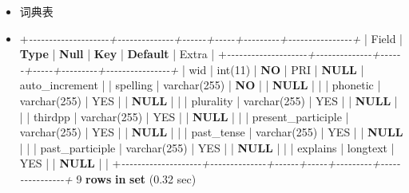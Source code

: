 \documentclass[
]{article}
\newenvironment{Shaded}{}{}
\newcommand{\CommentTok}[1]{\textcolor[rgb]{0.38,0.63,0.69}{\textit{#1}}}
\newcommand{\DataTypeTok}[1]{\textcolor[rgb]{0.56,0.13,0.00}{#1}}
\newcommand{\DecValTok}[1]{\textcolor[rgb]{0.25,0.63,0.44}{#1}}
\newcommand{\FloatTok}[1]{\textcolor[rgb]{0.25,0.63,0.44}{#1}}
\newcommand{\KeywordTok}[1]{\textcolor[rgb]{0.00,0.44,0.13}{\textbf{#1}}}
\newcommand{\NormalTok}[1]{#1}
\newcommand{\OperatorTok}[1]{\textcolor[rgb]{0.40,0.40,0.40}{#1}}
\begin{document}
\begin{itemize}
\item
  词典表
\item
\begin{Shaded}
\begin{Highlighting}[]
\OperatorTok{+}\CommentTok{{-}{-}{-}{-}{-}{-}{-}{-}{-}{-}{-}{-}{-}{-}{-}{-}{-}{-}{-}{-}+{-}{-}{-}{-}{-}{-}{-}{-}{-}{-}{-}{-}{-}{-}+{-}{-}{-}{-}{-}{-}+{-}{-}{-}{-}{-}+{-}{-}{-}{-}{-}{-}{-}{-}{-}+{-}{-}{-}{-}{-}{-}{-}{-}{-}{-}{-}{-}{-}{-}{-}{-}+}
\NormalTok{| Field              | }\KeywordTok{Type}\NormalTok{         | }\KeywordTok{Null}\NormalTok{ | }\KeywordTok{Key}\NormalTok{ | }\KeywordTok{Default}\NormalTok{ | Extra          |}
\OperatorTok{+}\CommentTok{{-}{-}{-}{-}{-}{-}{-}{-}{-}{-}{-}{-}{-}{-}{-}{-}{-}{-}{-}{-}+{-}{-}{-}{-}{-}{-}{-}{-}{-}{-}{-}{-}{-}{-}+{-}{-}{-}{-}{-}{-}+{-}{-}{-}{-}{-}+{-}{-}{-}{-}{-}{-}{-}{-}{-}+{-}{-}{-}{-}{-}{-}{-}{-}{-}{-}{-}{-}{-}{-}{-}{-}+}
\NormalTok{| wid                | }\DataTypeTok{int}\NormalTok{(}\DecValTok{11}\NormalTok{)      | }\KeywordTok{NO}\NormalTok{   | PRI | }\KeywordTok{NULL}\NormalTok{    | auto\_increment |}
\NormalTok{| spelling           | }\DataTypeTok{varchar}\NormalTok{(}\DecValTok{255}\NormalTok{) | }\KeywordTok{NO}\NormalTok{   |     | }\KeywordTok{NULL}\NormalTok{    |                |}
\NormalTok{| phonetic           | }\DataTypeTok{varchar}\NormalTok{(}\DecValTok{255}\NormalTok{) | YES  |     | }\KeywordTok{NULL}\NormalTok{    |                |}
\NormalTok{| plurality          | }\DataTypeTok{varchar}\NormalTok{(}\DecValTok{255}\NormalTok{) | YES  |     | }\KeywordTok{NULL}\NormalTok{    |                |}
\NormalTok{| thirdpp            | }\DataTypeTok{varchar}\NormalTok{(}\DecValTok{255}\NormalTok{) | YES  |     | }\KeywordTok{NULL}\NormalTok{    |                |}
\NormalTok{| present\_participle | }\DataTypeTok{varchar}\NormalTok{(}\DecValTok{255}\NormalTok{) | YES  |     | }\KeywordTok{NULL}\NormalTok{    |                |}
\NormalTok{| past\_tense         | }\DataTypeTok{varchar}\NormalTok{(}\DecValTok{255}\NormalTok{) | YES  |     | }\KeywordTok{NULL}\NormalTok{    |                |}
\NormalTok{| past\_participle    | }\DataTypeTok{varchar}\NormalTok{(}\DecValTok{255}\NormalTok{) | YES  |     | }\KeywordTok{NULL}\NormalTok{    |                |}
\NormalTok{| explains           | longtext     | YES  |     | }\KeywordTok{NULL}\NormalTok{    |                |}
\OperatorTok{+}\CommentTok{{-}{-}{-}{-}{-}{-}{-}{-}{-}{-}{-}{-}{-}{-}{-}{-}{-}{-}{-}{-}+{-}{-}{-}{-}{-}{-}{-}{-}{-}{-}{-}{-}{-}{-}+{-}{-}{-}{-}{-}{-}+{-}{-}{-}{-}{-}+{-}{-}{-}{-}{-}{-}{-}{-}{-}+{-}{-}{-}{-}{-}{-}{-}{-}{-}{-}{-}{-}{-}{-}{-}{-}+}
\DecValTok{9} \KeywordTok{rows} \KeywordTok{in} \KeywordTok{set}\NormalTok{ (}\FloatTok{0.32}\NormalTok{ sec)}
\end{Highlighting}
\end{Shaded}
\end{itemize}
\end{document}
